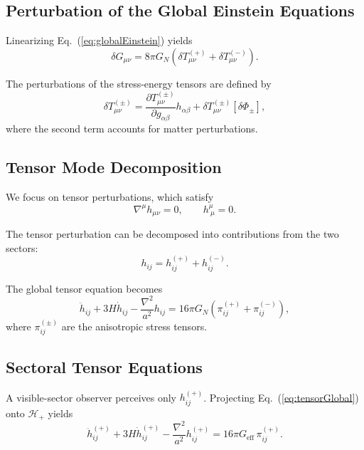 \documentclass[11pt,a4paper]{article}
\begin{document}
\subsection{Perturbation of the Global Einstein Equations}

Linearizing Eq.~(\ref{eq:globalEinstein}) yields
\begin{equation}
\delta G_{\mu\nu} = 8\pi G_N \left( \delta T_{\mu\nu}^{(+)} + \delta T_{\mu\nu}^{(-)} \right).
\label{eq:linEinstein}
\end{equation}

The perturbations of the stress-energy tensors are defined by
\begin{equation}
\delta T_{\mu\nu}^{(\pm)} = 
\frac{\partial T_{\mu\nu}^{(\pm)}}{\partial g_{\alpha\beta}} h_{\alpha\beta}
+ \delta T_{\mu\nu}^{(\pm)}[\delta \Phi_\pm],
\end{equation}
where the second term accounts for matter perturbations.

\subsection{Tensor Mode Decomposition}

We focus on tensor perturbations, which satisfy
\begin{equation}
\nabla^\mu h_{\mu\nu} = 0, \qquad h^\mu_{\ \mu} = 0.
\end{equation}

The tensor perturbation can be decomposed into contributions from the two sectors:
\begin{equation}
h_{ij} = h_{ij}^{(+)} + h_{ij}^{(-)}.
\end{equation}

The global tensor equation becomes
\begin{equation}
\ddot{h}_{ij} + 3H \dot{h}_{ij} - \frac{\nabla^2}{a^2} h_{ij}
= 16\pi G_N \left( \pi_{ij}^{(+)} + \pi_{ij}^{(-)} \right),
\label{eq:tensorGlobal}
\end{equation}
where $\pi_{ij}^{(\pm)}$ are the anisotropic stress tensors.

\subsection{Sectoral Tensor Equations}

A visible-sector observer perceives only $h_{ij}^{(+)}$. Projecting Eq.~(\ref{eq:tensorGlobal}) onto $\mathcal{H}_+$ yields
\begin{equation}
\ddot{h}_{ij}^{(+)} + 3H \dot{h}_{ij}^{(+)} - \frac{\nabla^2}{a^2} h_{ij}^{(+)}
= 16\pi G_{\mathrm{eff}} \, \pi_{ij}^{(+)}.
\label{eq:tensorSector}
\end{equation}
\end{document}
